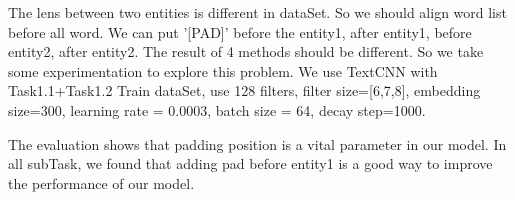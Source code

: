 

The lens between two entities is different in dataSet. So we should align word list before all word. We can put '[PAD]' before the entity1, after entity1, before entity2, after entity2. The result of 4 methods should be different. So we take some experimentation to explore this problem. We use TextCNN with Task1.1+Task1.2 Train dataSet, use 128 filters, filter size=[6,7,8], embedding size=300, learning rate = 0.0003, batch size = 64, decay step=1000.



The evaluation shows that padding position is a vital parameter in our model. In all subTask, we found that adding pad before entity1 is a good way to improve the performance of our model.